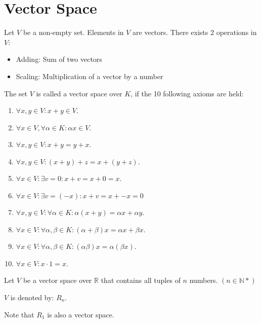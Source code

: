 
\chapter{Vector Space}


    \par Let $V$ be a non-empty set. Elements in $V$ are vectors. There exists
    2 operations in $V$:
    \begin{itemize}
      \item Adding: Sum of two vectors
      \item Scaling: Multiplication of a vector by a number
    \end{itemize}

    \par The set $V$ is called a vector space over $K$, if the 10 following
    axioms are held:
    \begin{enumerate}
      \item $\forall x, y \in V: x + y \in V$.
      \item $\forall x \in V, \forall \alpha \in K: \alpha x \in V$.
      \item $\forall x, y \in V: x + y = y + x$.
      \item $\forall x, y \in V: (x + y) + z = x + (y + z)$.
      \item $\forall x \in V: \exists v = 0: x + v = x + 0 = x$.
      \item $\forall x \in V: \exists v = (-x): x + v = x + -x = 0$
      \item $\forall x, y \in V: \forall \alpha \in K:
        \alpha (x + y) = \alpha x + \alpha y$.
      \item $\forall x \in V: \forall \alpha, \beta \in K:
        (\alpha + \beta) x = \alpha x + \beta x$.
      \item $\forall x \in V: \forall \alpha, \beta \in K:
        (\alpha\beta) x = \alpha(\beta x)$.
      \item $\forall x \in V: x \cdot 1 = x$.
    \end{enumerate}

      \par Let $V$ be a vector space over $\mathbb{R}$ that contains all
        tuples of $n$ numbers. $(n \in \mathbb{N*})$
      \par $V$ is denoted by: $R_{n}$.
      \par Note that $R_{1}$ is also a vector space.

